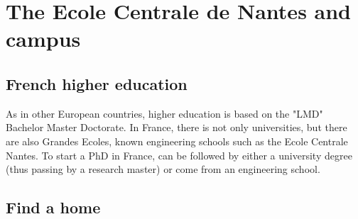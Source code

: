 \chapter{The Ecole Centrale de Nantes and campus}

\section{French higher education}


As in other European countries, higher education is based on the "LMD" Bachelor Master Doctorate.
In France, there is not only universities, but there are also Grandes Ecoles, known engineering schools such as the Ecole Centrale Nantes.
To start a PhD in France, can be followed by either a university degree (thus passing by a research master) or come from an engineering school.



\section{Find a home}
